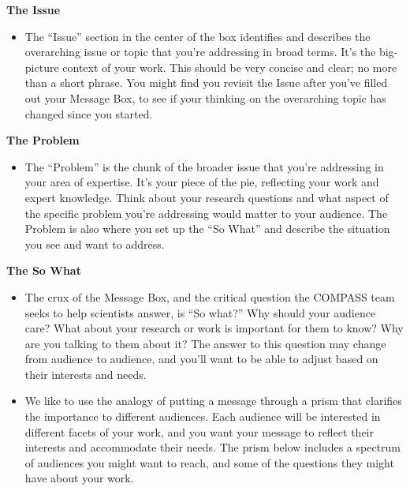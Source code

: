 \documentclass[
]{book}
\providecommand{\tightlist}{%
  \setlength{\itemsep}{0pt}\setlength{\parskip}{0pt}}
\begin{document}
\textbf{The Issue}

\begin{itemize}
\tightlist
\item
  The ``Issue'' section in the center of the box identifies and describes the overarching issue or topic that you're addressing in broad terms. It's the big-picture context of your work. This should be very concise and clear; no more than a short phrase. You might find you revisit the Issue after you've filled out your Message Box, to see if your thinking on the overarching topic has changed since you started.
\end{itemize}

\textbf{The Problem}

\begin{itemize}
\tightlist
\item
  The ``Problem'' is the chunk of the broader issue that you're addressing in your area of expertise. It's your piece of the pie, reflecting your work and expert knowledge. Think about your research questions and what aspect of the specific problem you're addressing would matter to your audience. The Problem is also where you set up the ``So What'' and describe the situation you see and want to address.
\end{itemize}

\textbf{The So What}

\begin{itemize}
\item
  The crux of the Message Box, and the critical question the COMPASS team seeks to help scientists answer, is ``So what?'' Why should your audience care? What about your research or work is important for them to know? Why are you talking to them about it? The answer to this question may change from audience to audience, and you'll want to be able to adjust based on their interests and needs.
\item
  We like to use the analogy of putting a message through a prism that clarifies the importance to different audiences. Each audience will be interested in different facets of your work, and you want your message to reflect their interests and accommodate their needs. The prism below includes a spectrum of audiences you might want to reach, and some of the questions they might have about your work.
\end{itemize}
\end{document}
